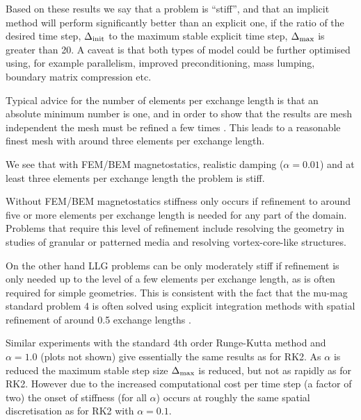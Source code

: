 Based on these results we say that a problem is ``stiff'', and that an implicit method will perform significantly better than an explicit one, if the ratio of the desired time step, $\Delta_{\text{init}}$ to the maximum stable explicit time step, $\Delta_{\text{max}}$ is greater than 20.
A caveat is that both types of model could be further optimised using, for example parallelism, improved preconditioning, mass lumping, boundary matrix compression\cite[Sec. 3]{Knittel2011} etc.

Typical advice for the number of elements per exchange length is that an absolute minimum number is one, and in order to show that the results are mesh independent the mesh must be refined a few times \cite[Sec. 11]{nmag-manual}.
This leads to a reasonable finest mesh with around three elements per exchange length.

We see that with FEM/BEM magnetostatics, realistic damping ($\alpha = 0.01$) and at least three elements per exchange length the problem is stiff.

Without FEM/BEM magnetostatics stiffness only occurs if refinement to around five or more elements per exchange length is needed for any part of the domain.
Problems that require this level of refinement include resolving the geometry in studies of granular or patterned media\cite{Suess2002} and resolving vortex-core-like structures\cite{Andreas2014}.

On the other hand LLG problems can be only moderately stiff if refinement is only needed up to the level of a few elements per exchange length, as is often required for simple geometries.
This is consistent with the fact that the mu-mag standard problem 4 is often solved using explicit integration methods with spatial refinement of around 0.5 exchange lengths \cite{mumag-website}.

Similar experiments with the standard 4th order Runge-Kutta method\cite[41]{Iserles2009} and $\alpha=1.0$ (plots not shown) give essentially the same results as for RK2. As $\alpha$ is reduced the maximum stable step size $\Delta_{\text{max}}$ is reduced, but not as rapidly as for RK2. However due to the increased computational cost per time step (a factor of two) the onset of stiffness (for all $\alpha$) occurs at roughly the same spatial discretisation as for RK2 with $\alpha = 0.1$.


